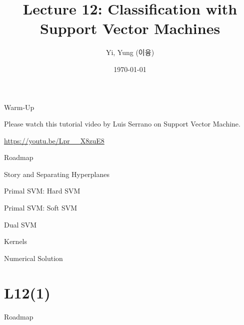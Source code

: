 \documentclass[handout,fleqn,aspectratio=169]{beamer}
\title[]{Lecture 12: Classification with Support Vector Machines}
\author{Yi, Yung (이융)}
\institute{Mathematics for Machine Learning\\ KAIST EE}
\date{\today}
\begin{document}





\begin{frame}{Warm-Up}

{\Large Please watch this tutorial video by Luis Serrano on Support Vector Machine.}

\bigskip

\bigskip

\url{https://youtu.be/Lpr__X8zuE8}

\end{frame}


\begin{frame}{Roadmap}

\plitemsep 0.1in

\bce[(1)] 

\item Story and Separating Hyperplanes 
\item Primal SVM: Hard SVM 
\item Primal SVM: Soft SVM 
\item Dual SVM 
\item Kernels 
\item Numerical Solution 

\ece
\end{frame}

\section{L12(1)}
\begin{frame}{Roadmap}

\plitemsep 0.1in

\bce[(1)] 

\item {}
\item {}

\ece
\end{frame}
\end{document}
